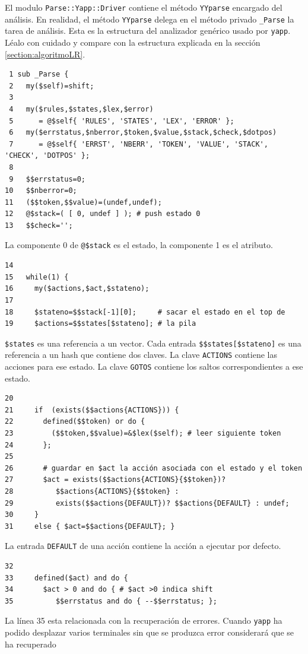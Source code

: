 El modulo {\tt Parse::Yapp::Driver} contiene el método
\verb|YYparse| encargado del análisis.
En realidad, el método \verb|YYparse| delega 
en el método privado \verb|_Parse| la tarea de análisis.
Esta es la estructura del analizador genérico usado por \verb|yapp|.
Léalo con cuidado y compare con la estructura explicada en la
sección \ref{section:algoritmoLR}.

\begin{verbatim}
 1 sub _Parse {
 2   my($self)=shift;
 3 
 4   my($rules,$states,$lex,$error)
 5      = @$self{ 'RULES', 'STATES', 'LEX', 'ERROR' };
 6   my($errstatus,$nberror,$token,$value,$stack,$check,$dotpos)
 7      = @$self{ 'ERRST', 'NBERR', 'TOKEN', 'VALUE', 'STACK', 'CHECK', 'DOTPOS' };
 8 
 9   $$errstatus=0;
10   $$nberror=0;
11   ($$token,$$value)=(undef,undef);
12   @$stack=( [ 0, undef ] ); # push estado 0
13   $$check='';
\end{verbatim}
La componente 0 de \verb|@$stack| es el estado, la componente
1 es el atributo.
\begin{verbatim}
14 
15   while(1) { 
16     my($actions,$act,$stateno);
17 
18     $stateno=$$stack[-1][0];     # sacar el estado en el top de 
19     $actions=$$states[$stateno]; # la pila
\end{verbatim}
\verb|$states| es una referencia a un vector. Cada entrada 
\verb|$$states[$stateno]| es una referencia a un hash que 
contiene dos claves. La clave \verb|ACTIONS| contiene
las acciones para ese estado. La clave \verb|GOTOS|
contiene los saltos correspondientes a ese estado.
\begin{verbatim}
20 
21     if  (exists($$actions{ACTIONS})) {
22       defined($$token) or do {
23         ($$token,$$value)=&$lex($self); # leer siguiente token
24       };
25 
26       # guardar en $act la acción asociada con el estado y el token
27       $act = exists($$actions{ACTIONS}{$$token})?   
28          $$actions{ACTIONS}{$$token} : 
29          exists($$actions{DEFAULT})? $$actions{DEFAULT} : undef;
30     }
31     else { $act=$$actions{DEFAULT}; }
\end{verbatim}
La entrada \verb|DEFAULT| de una acción contiene la acción 
a ejecutar por defecto.
\begin{verbatim}
32 
33     defined($act) and do {
34       $act > 0 and do { # $act >0 indica shift
35          $$errstatus and do { --$$errstatus; };
\end{verbatim}
La línea 35 esta relacionada con la recuperación de errores.
Cuando \verb|yapp| ha podido desplazar varios terminales
sin que se produzca error considerará que se ha recuperado 
